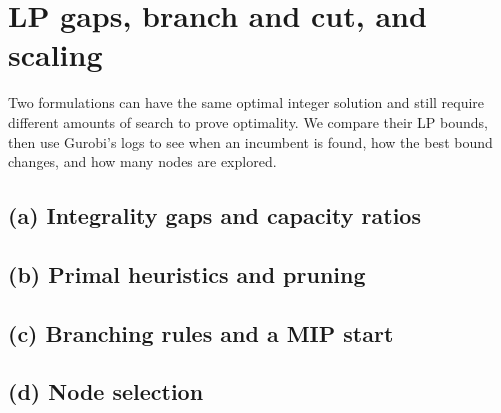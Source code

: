 \documentclass[11pt]{article}
\theoremstyle{definition}
\begin{document}

\section{LP gaps, branch and cut, and scaling}

Two formulations can have the same optimal integer solution and still
require different amounts of search to prove optimality. We compare their
LP bounds, then use Gurobi's logs to see when an incumbent is found, how
the best bound changes, and how many nodes are explored.


\subsection*{(a) Integrality gaps and capacity ratios}

\subsection*{(b) Primal heuristics and pruning}

\subsection*{(c) Branching rules and a MIP start}

\subsection*{(d) Node selection}
\end{document}
